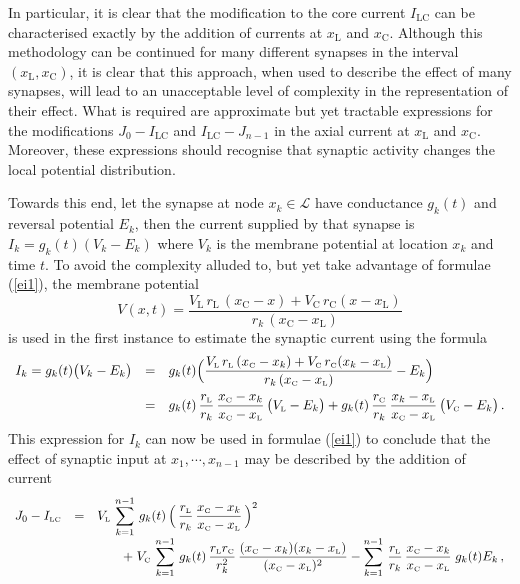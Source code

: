In particular, it is clear that the modification to the core
current $I_\mathrm{LC}$ can be characterised exactly by the
addition of currents at $x_\mathrm{L}$ and $x_\mathrm{C}$.
Although this methodology can be continued for many different
synapses in the interval $(x_\mathrm{L},x_\mathrm{C})$, it is
clear that this approach, when used to describe the effect of many
synapses, will lead to an unacceptable level of complexity in the
representation of their effect. What is required are approximate
but yet tractable expressions for the modifications
$J_0-I_\mathrm{LC}$ and $I_\mathrm{LC}-J_{n-1}$ in the axial
current at $x_\mathrm{L}$ and $x_\mathrm{C}$. Moreover, these
expressions should recognise that synaptic activity changes the
local potential distribution.

Towards this end, let the synapse at node $x_k\in\mathcal{L}$ have
conductance $g_k(t)$ and reversal potential $E_k$, then the
current supplied by that synapse is $I_k=g_k(t)(V_k-E_k)$ where
$V_k$ is the membrane potential at location $x_k$ and time $t$. To
avoid the complexity alluded to, but yet take advantage of
formulae (\ref{ei1}), the membrane potential
\[
V(x,t)=\frac{V_\mathrm{L}\,r_\mathrm{L}\,(x_\mathrm{C}-x)+
V_\mathrm{C}\,r_\mathrm{C}(x-x_\mathrm{L})}{r_k\,
(x_\mathrm{C}-x_\mathrm{L})}
\]
is used in the first instance to estimate the synaptic current
using the formula
\begin{equation}\label{si3}
\begin{array}{rcl}
I_k=g_k(t)\big(V_k-E_k\big) & = & \displaystyle g_k(t)\Big(
\frac{V_{\mbox{\tiny L}}\,r_{\mbox{\tiny L}}\,(x_{\mbox{\tiny C}}-x_k)+
V_{\mbox{\tiny C}}\,r_{\mbox{\tiny C}}(x_k-x_{\mbox{\tiny L}})}{r_k\,
(x_{\mbox{\tiny C}}-x_{\mbox{\tiny L}})}-E_k\Big)\\[10pt]
& = & \displaystyle g_k(t)\,\frac{r_{\mbox{\tiny L}}}{r_k}\,\frac{x_{\mbox{\tiny C}}-x_k}
{x_{\mbox{\tiny C}}-x_{\mbox{\tiny L}}}\,\big(V_{\mbox{\tiny L}}-E_k\big)
+g_k(t)\,\frac{r_{\mbox{\tiny C}}}{r_k}\,\frac{x_k-x_{\mbox{\tiny L}}}
{x_{\mbox{\tiny C}}-x_{\mbox{\tiny L}}}\,\big(V_{\mbox{\tiny C}}-E_k\big)\,.
\end{array}
\end{equation}
This expression for $I_k$ can now be used in formulae (\ref{ei1})
to conclude that the effect of synaptic input at $x_1,\cdots,
x_{n-1}$ may be described by the addition of current
\begin{equation}\label{si4}
\begin{array}{rcl}
J_0-I_{\mbox{\tiny LC}} & = & \displaystyle V_{\mbox{\tiny L}}\,\sum_{k=1}^{n-1}\,g_k(t)\,
\Big(\,\frac{r_{\mbox{\tiny L}}}{r_k}\,\frac{x_{\mbox{\tiny C}}-x_k}
{x_{\mbox{\tiny C}}-x_{\mbox{\tiny L}}}\,\Big)^2\\[10pt]
&&\qquad\displaystyle+\; V_{\mbox{\tiny C}}\,\sum_{k=1}^{n-1}\,g_k(t)\,
\frac{r_{\mbox{\tiny L}} r_{\mbox{\tiny C}}}{r^2_k}\,
\frac{(x_{\mbox{\tiny C}}-x_k)(x_k-x_{\mbox{\tiny L}})}
{(x_{\mbox{\tiny C}}-x_{\mbox{\tiny L}})^2}-\sum_{k=1}^{n-1}\,
\frac{r_{\mbox{\tiny L}}}{r_k}\,
\frac{x_{\mbox{\tiny C}}-x_k}{x_{\mbox{\tiny C}}-x_{\mbox{\tiny L}}}\;g_k(t) E_k\,,
\end{array}
\end{equation}
